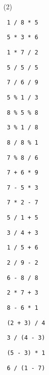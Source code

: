 \begin{exercise}
 

\begin{sltasks}[resume=true](2)
    \task
    \begin{items}
        \item \texttt{ 1 / 8 * 5 }
        \item \texttt{ 5 * 3 * 6 }
        \item \texttt{ 1 * 7 / 2 }
        \item \texttt{ 5 / 5 / 5 }
        \item \texttt{ 7 / 6 / 9 }
    \end{items}
    \task
    \begin{items}
        \item \texttt{ 5 \% 1 / 3 }
        \item \texttt{ 8 \% 5 \% 8 }
        \item \texttt{ 3 \% 1 / 8 }
        \item \texttt{ 8 / 8 \% 1 }
        \item \texttt{ 7 \% 8 / 6 }
    \end{items}
    \task
    \begin{items}
        \item \texttt{ 7 + 6 * 9 }
        \item \texttt{ 7 - 5 * 3 }
        \item \texttt{ 7 * 2 - 7 }
        \item \texttt{ 5 / 1 + 5 }
        \item \texttt{ 3 / 4 + 3 }
    \end{items}
    \task
    \begin{items}
        \item \texttt{ 1 / 5 + 6 }
        \item \texttt{ 2 / 9 - 2 }
        \item \texttt{ 6 - 8 / 8 }
        \item \texttt{ 2 * 7 + 3 }
        \item \texttt{ 8 - 6 * 1 }
    \end{items}
    \task
    \begin{items}
        \item \texttt{ (2 + 3) / 4 }
        \item \texttt{ 3 / (4 - 3) }
        \item \texttt{ (5 - 3) * 1 }
        \item \texttt{ 6 / (1 - 7) }

\end{items}
\end{sltasks}
\end{exercise}
